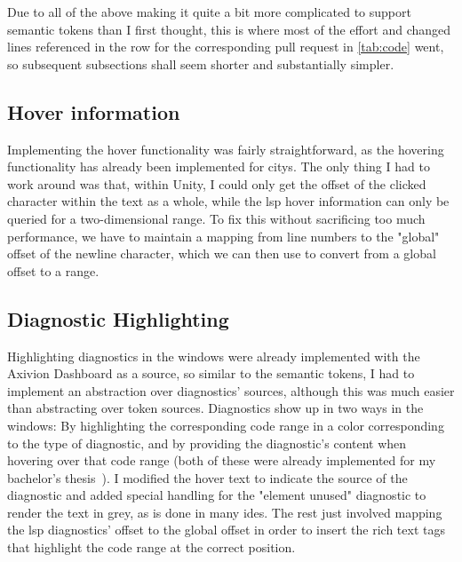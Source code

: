 \documentclass[../thesis]{subfiles}
\begin{document}
Due to all of the above making it quite a bit more complicated to support semantic tokens than I first thought, this is where most of the effort and changed lines referenced in the row for the corresponding pull request in \cref{tab:code} went,
so subsequent subsections shall seem shorter and substantially simpler.

\subsection{Hover information}
Implementing the hover functionality was fairly straightforward, as the hovering functionality has already been implemented for \glspl{city}.
The only thing I had to work around was that, within Unity, I could only get the offset of the clicked character within the text as a whole, while the \gls{lsp} hover information can only be queried for a two-dimensional \gls{range}.
To fix this without sacrificing too much performance, we have to maintain a mapping from line numbers to the "global" offset of the newline character, which we can then use to convert from a global offset to a \gls{range}.

\subsection{Diagnostic Highlighting}
Highlighting diagnostics in the \glspl{window} were already implemented with the Axivion Dashboard as a source, so
similar to the semantic tokens, I had to implement an abstraction over diagnostics' sources, although this was much easier than abstracting over token sources.
Diagnostics show up in two ways in the \glspl{window}:
By highlighting the corresponding code range in a color corresponding to the type of diagnostic, and by providing the diagnostic's content when hovering over that code range (both of these were already implemented for my bachelor's thesis~\cite{galperin2021}).
I modified the hover text to indicate the source of the diagnostic and added special handling for the "element unused" diagnostic to render the text in grey, as is done in many \glspl{ide}.
The rest just involved mapping the \gls{lsp} diagnostics' offset to the global offset in order to insert the rich text tags that highlight the code range at the correct position.
\end{document}
